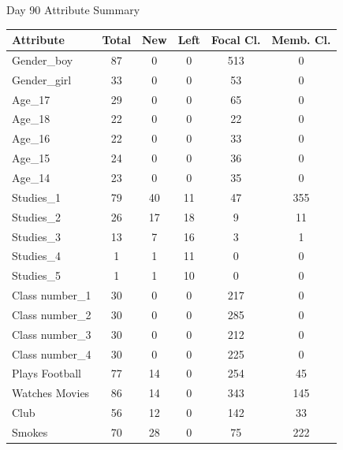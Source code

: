 \begin{question}
\begin{subquestion}
{		\begin{center}
			Day 90 Attribute Summary
\begin{tabular}{lccccc}
				\hline
				Attribute          & Total & New & Left & Focal Cl. & Memb. Cl. \\ \hline
				Gender\_boy        & 87    & 0   & 0    & 513       & 0         \\
				Gender\_girl       & 33    & 0   & 0    & 53        & 0         \\
				Age\_17            & 29    & 0   & 0    & 65        & 0         \\
				Age\_18            & 22    & 0   & 0    & 22        & 0         \\
				Age\_16            & 22    & 0   & 0    & 33        & 0         \\
				Age\_15            & 24    & 0   & 0    & 36        & 0         \\
				Age\_14            & 23    & 0   & 0    & 35        & 0         \\
				Studies\_1         & 79    & 40  & 11   & 47        & 355       \\
				Studies\_2         & 26    & 17  & 18   & 9         & 11        \\
				Studies\_3         & 13    & 7   & 16   & 3         & 1         \\
				Studies\_4         & 1     & 1   & 11   & 0         & 0         \\
				Studies\_5         & 1     & 1   & 10   & 0         & 0         \\
				Class number\_1    & 30    & 0   & 0    & 217       & 0         \\
				Class number\_2    & 30    & 0   & 0    & 285       & 0         \\
				Class number\_3    & 30    & 0   & 0    & 212       & 0         \\
				Class number\_4    & 30    & 0   & 0    & 225       & 0         \\
				Plays Football     & 77    & 14  & 0    & 254       & 45        \\
				Watches Movies     & 86    & 14  & 0    & 343       & 145       \\
				Club               & 56    & 12  & 0    & 142       & 33        \\
				Smokes             & 70    & 28  & 0    & 75        & 222       \\ \hline
			\end{tabular}
		\end{center}
		
		}
	\end{subquestion}
\end{question}